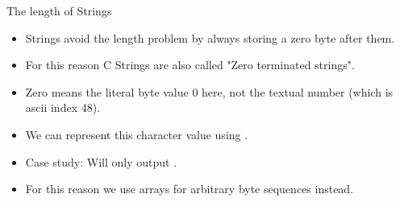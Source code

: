 \documentclass[10pt,graphics,aspectratio=169,table]{beamer}
\begin{document}
\begin{frame}[fragile]{The length of Strings}
\begin{itemize}
    \item Strings avoid the length problem by always storing a zero byte after them.
    \item  For this reason C Strings are also called "Zero terminated strings".
    \item Zero means the literal byte value 0 here, not the textual number 
        (which is ascii index 48).
    \item We can represent this character value using .
    \item Case study:  Will only output . 
    \item For this reason we use arrays for arbitrary byte sequences instead. 
\end{itemize}
    
\end{frame}
\end{document}
